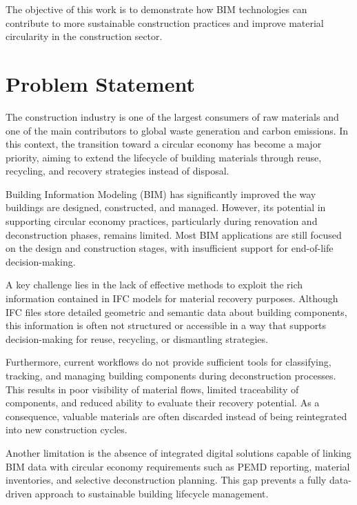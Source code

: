 \documentclass[11pt,a4paper]{article}
\begin{document}
The objective of this work is to demonstrate how BIM technologies can contribute to more sustainable construction practices and improve material circularity in the construction sector.

\section{Problem Statement}

The construction industry is one of the largest consumers of raw materials and one of the main contributors to global waste generation and carbon emissions. In this context, the transition toward a circular economy has become a major priority, aiming to extend the lifecycle of building materials through reuse, recycling, and recovery strategies instead of disposal.

Building Information Modeling (BIM) has significantly improved the way buildings are designed, constructed, and managed. However, its potential in supporting circular economy practices, particularly during renovation and deconstruction phases, remains limited. Most BIM applications are still focused on the design and construction stages, with insufficient support for end-of-life decision-making.

A key challenge lies in the lack of effective methods to exploit the rich information contained in IFC models for material recovery purposes. Although IFC files store detailed geometric and semantic data about building components, this information is often not structured or accessible in a way that supports decision-making for reuse, recycling, or dismantling strategies.

Furthermore, current workflows do not provide sufficient tools for classifying, tracking, and managing building components during deconstruction processes. This results in poor visibility of material flows, limited traceability of components, and reduced ability to evaluate their recovery potential. As a consequence, valuable materials are often discarded instead of being reintegrated into new construction cycles.

Another limitation is the absence of integrated digital solutions capable of linking BIM data with circular economy requirements such as PEMD reporting, material inventories, and selective deconstruction planning. This gap prevents a fully data-driven approach to sustainable building lifecycle management.
\end{document}

